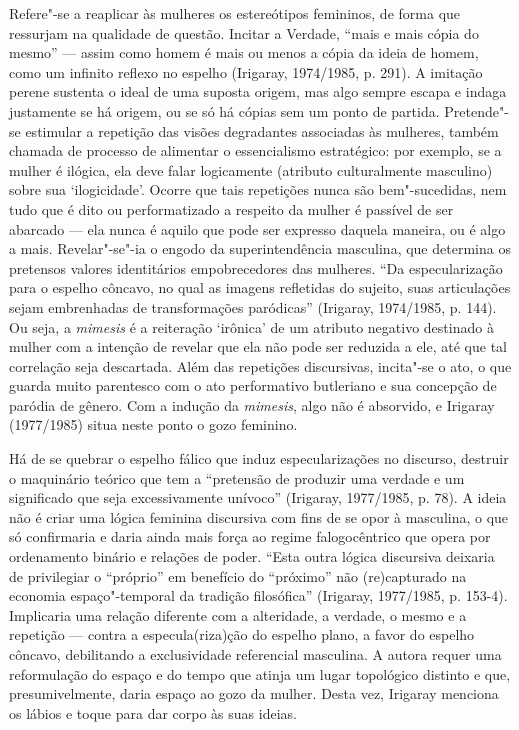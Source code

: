 Refere"-se a reaplicar às mulheres os estereótipos femininos, de forma
que ressurjam na qualidade de questão. Incitar a Verdade, ``mais e mais
cópia do mesmo'' --- assim como homem é mais ou menos a cópia da ideia
de homem, como um infinito reflexo no espelho (Irigaray, 1974/1985, p.
291). A imitação perene sustenta o ideal de uma suposta origem, mas algo
sempre escapa e indaga justamente se há origem, ou se só há cópias sem
um ponto de partida. Pretende"-se estimular a repetição das visões
degradantes associadas às mulheres, também chamada de processo de
alimentar o essencialismo estratégico: por exemplo, se a mulher é
ilógica, ela deve falar logicamente (atributo culturalmente masculino)
sobre sua `ilogicidade'. Ocorre que tais repetições nunca são
bem"-sucedidas, nem tudo que é dito ou performatizado a respeito da
mulher é passível de ser abarcado --- ela nunca é aquilo que pode ser
expresso daquela maneira, ou é algo a mais. Revelar"-se"-ia o engodo da
superintendência masculina, que determina os pretensos valores
identitários empobrecedores das mulheres. ``Da especularização para o
espelho côncavo, no qual as imagens refletidas do sujeito, suas
articulações sejam embrenhadas de transformações paródicas'' (Irigaray,
1974/1985, p. 144). Ou seja, a \emph{mimesis} é a reiteração `irônica'
de um atributo negativo destinado à mulher com a intenção de revelar que
ela não pode ser reduzida a ele, até que tal correlação seja descartada.
Além das repetições discursivas, incita"-se o ato, o que guarda muito
parentesco com o ato performativo butleriano e sua concepção de paródia
de gênero. Com a indução da \emph{mimesis}, algo não é absorvido, e
Irigaray (1977/1985) situa neste ponto o gozo feminino.

Há de se quebrar o espelho fálico que induz especularizações no
discurso, destruir o maquinário teórico que tem a ``pretensão de
produzir uma verdade e um significado que seja excessivamente unívoco''
(Irigaray, 1977/1985, p. 78). A ideia não é criar uma lógica feminina
discursiva com fins de se opor à masculina, o que só confirmaria e daria
ainda mais força ao regime falogocêntrico que opera por ordenamento
binário e relações de poder. ``Esta outra lógica discursiva deixaria de
privilegiar o ``próprio'' em benefício do ``próximo'' não (re)capturado
na economia espaço"-temporal da tradição filosófica'' (Irigaray,
1977/1985, p. 153-4). Implicaria uma relação diferente com a
alteridade, a verdade, o mesmo e a repetição --- contra a
especula(riza)ção do espelho plano, a favor do espelho côncavo,
debilitando a exclusividade referencial masculina. A autora requer uma
reformulação do espaço e do tempo que atinja um lugar topológico
distinto e que, presumivelmente, daria espaço ao gozo da mulher. Desta
vez, Irigaray menciona os lábios e toque para dar corpo às suas ideias.

